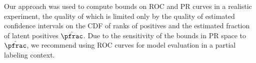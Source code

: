 Our approach was used to compute bounds on ROC and PR curves in a realistic experiment, the quality of which is limited only by the quality of estimated confidence intervals on the CDF of ranks of positives and the estimated fraction of latent positives $\hat{\pfrac}$. Due to the sensitivity of the bounds in PR space to $\hat{\pfrac}$, we recommend using ROC curves for model evaluation in a partial labeling context. %
